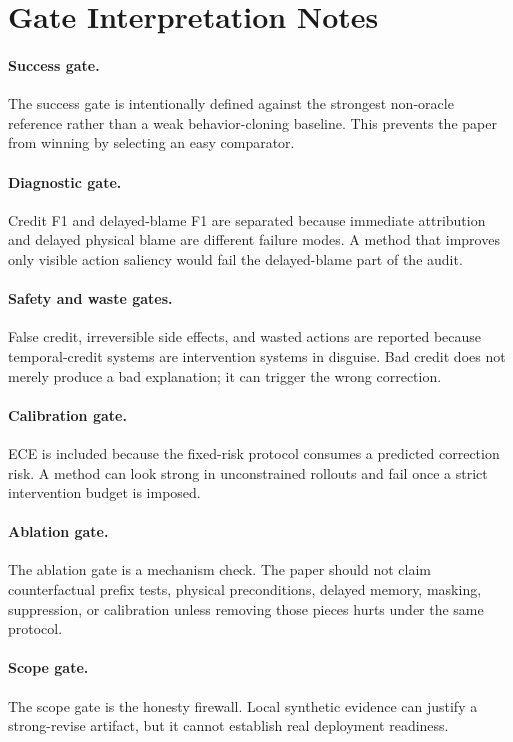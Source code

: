 \documentclass{article}
\begin{document}
\section{Gate Interpretation Notes}
\paragraph{Success gate.}
The success gate is intentionally defined against the strongest non-oracle reference rather than a weak behavior-cloning baseline. This prevents the paper from winning by selecting an easy comparator.

\paragraph{Diagnostic gate.}
Credit F1 and delayed-blame F1 are separated because immediate attribution and delayed physical blame are different failure modes. A method that improves only visible action saliency would fail the delayed-blame part of the audit.

\paragraph{Safety and waste gates.}
False credit, irreversible side effects, and wasted actions are reported because temporal-credit systems are intervention systems in disguise. Bad credit does not merely produce a bad explanation; it can trigger the wrong correction.

\paragraph{Calibration gate.}
ECE is included because the fixed-risk protocol consumes a predicted correction risk. A method can look strong in unconstrained rollouts and fail once a strict intervention budget is imposed.

\paragraph{Ablation gate.}
The ablation gate is a mechanism check. The paper should not claim counterfactual prefix tests, physical preconditions, delayed memory, masking, suppression, or calibration unless removing those pieces hurts under the same protocol.

\paragraph{Scope gate.}
The scope gate is the honesty firewall. Local synthetic evidence can justify a strong-revise artifact, but it cannot establish real deployment readiness.



\end{document}
